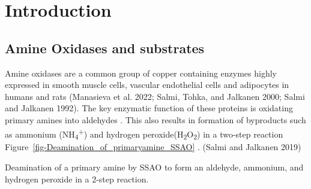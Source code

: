 \documentclass[
  letterpaper,
  DIV=11,
  numbers=noendperiod]{scrreprt}
\begin{document}

\chapter{Introduction}\label{introduction}

\section{\texorpdfstring{\textbf{Amine Oxidases and
substrates}}{Amine Oxidases and substrates}}\label{amine-oxidases-and-substrates}

Amine oxidases are a common group of copper containing enzymes highly
expressed in smooth muscle cells, vascular endothelial cells and
adipocytes in humans and rats (Manasieva et al. 2022; Salmi, Tohka, and
Jalkanen 2000; Salmi and Jalkanen 1992). The key enzymatic function of
these proteins is oxidating primary amines into aldehydes . This also
results in formation of byproducts such as ammonium
(NH\textsubscript{4}\textsuperscript{+}) and hydrogen
peroxide(H\textsubscript{2}O\textsubscript{2}) in a two-step reaction
Figure~\ref{fig-Deamination_of_primaryamine_SSAO} . (Salmi and Jalkanen
2019)

\begin{fig}


\caption{\label{fig-Deamination_of_primaryamine_SSAO}Deamination of a
primary amine by SSAO to form an aldehyde, ammonium, and hydrogen
peroxide in a 2-step reaction.}

\end{fig}%
\end{document}
